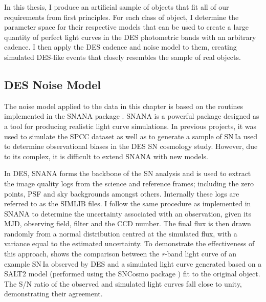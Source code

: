 In this thesis, I produce an artificial sample of objects that fit all of our requirements from first principles. For each class of object, I determine the parameter space for their respective models that can be used to create a large quantity of perfect light curves in the DES photometric bands with an arbitrary cadence. I then apply the DES cadence and noise model to them, creating simulated DES-like events that closely resembles the sample of real objects.

\subsection{DES Noise Model} \label{sec:NoiseModel}
The noise model applied to the data in this chapter is based on the routines implemented in the SNANA package \citep{Kessler2009}. SNANA is a powerful package designed as a tool for producing realistic light curve simulations. In previous projects, it was used to simulate the SPCC dataset \citep{Kessler2010} as well as to generate a sample of SN\,Ia used to determine observational biases in the DES SN cosmology study. However, due to its complex, it is difficult to extend SNANA with new models.

In DES, SNANA forms the backbone of the SN analysis and is used to extract the image quality logs from the science and reference frames; including the zero points, PSF and sky backgrounds amongst others. Internally these logs are referred to as the \textsc{SIMLIB} files. I follow the same procedure as implemented in SNANA to determine the uncertainty associated with an observation, given its MJD, observing field, filter and the CCD number. The final flux is then drawn randomly from a normal distribution centred at the simulated flux, with a variance equal to the estimated uncertainty. To demonstrate the effectiveness of this approach,  shows the comparison between the \textit{r}-band light curve of an example SN\,Ia observed by DES and a simulated light curve generated based on a SALT2 model (performed using the SNCosmo package \citep{Barbary2014}) fit to the original object. The S/N ratio of the observed and simulated light curves fall close to unity, demonstrating their agreement.

